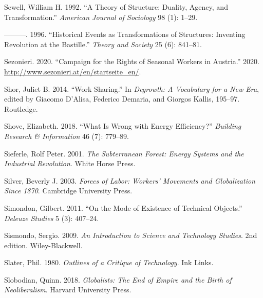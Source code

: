 \documentclass[a4paper, nobind]{templates/ociamthesis}
\newlength{\cslhangindent}
\newenvironment{CSLReferences}[2] %
 {%
  \setlength{\parindent}{0pt}
  \ifodd #1
  \let\oldpar\par
  \def\par{\hangindent=\cslhangindent\oldpar}
  \fi
  \setlength{\parskip}{1mm}
  \setlength{\baselineskip}{6mm}
 }%
 {}
\begin{document}
\begin{CSLReferences}{1}{0}
\leavevmode{}%
Sewell, William H. 1992. {``A Theory of Structure: {Duality}, Agency, and Transformation.''} \emph{American Journal of Sociology} 98 (1): 1--29.

\leavevmode{}%
---------. 1996. {``Historical Events as Transformations of Structures: {Inventing} Revolution at the {Bastille}.''} \emph{Theory and Society} 25 (6): 841--81.

\leavevmode{}%
Sezonieri. 2020. {``Campaign for the Rights of Seasonal Workers in {Austria}.''} 2020. \url{http://www.sezonieri.at/en/startseite_en/}.

\leavevmode{}%
Shor, Juliet B. 2014. {``Work {Sharing}.''} In \emph{Degrowth: {A Vocabulary} for a {New Era}}, edited by Giacomo D'Alisa, Federico Demaria, and Giorgos Kallis, 195--97. {Routledge}.

\leavevmode{}%
Shove, Elizabeth. 2018. {``What Is Wrong with Energy Efficiency?''} \emph{Building Research \& Information} 46 (7): 779--89.

\leavevmode{}%
Sieferle, Rolf Peter. 2001. \emph{The {Subterranean Forest}: {Energy Systems} and the {Industrial Revolution}}. {White Horse Press}.

\leavevmode{}%
Silver, Beverly J. 2003. \emph{Forces of {Labor}: {Workers}' {Movements} and {Globalization Since} 1870}. {Cambridge University Press}.

\leavevmode{}%
Simondon, Gilbert. 2011. {``On the Mode of Existence of Technical Objects.''} \emph{Deleuze Studies} 5 (3): 407--24.

\leavevmode{}%
Sismondo, Sergio. 2009. \emph{An {Introduction} to {Science} and {Technology Studies}}. 2nd edition. {Wiley-Blackwell}.

\leavevmode{}%
Slater, Phil. 1980. \emph{Outlines of a Critique of Technology}. {Ink Links}.

\leavevmode{}%
Slobodian, Quinn. 2018. \emph{Globalists: {The End} of {Empire} and the {Birth} of {Neoliberalism}}. {Harvard University Press}.


\end{CSLReferences}
\end{document}
